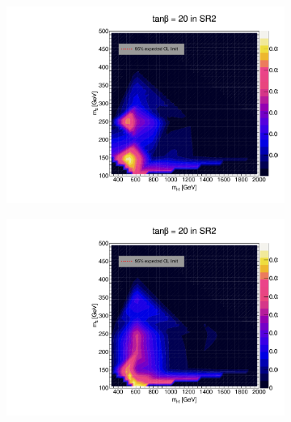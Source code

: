 \documentclass[12pt, a4paper]{book}
\begin{document}
\begin{figure}[!ht]
\begin{subfigure}[b]{0.49\textwidth}
   \end{subfigure}
   \hfill
   \begin{subfigure}[b]{0.49\textwidth}
      \centering
      \includegraphics[width=1\textwidth]{Limits/Model_independent/100-150/2HDM/2HDM_ee_tb20.pdf}
   \end{subfigure}
   \hfill
   \begin{subfigure}[b]{0.49\textwidth}
      \centering
      \includegraphics[width=1\textwidth]{Limits/Model_independent/100-150/2HDM/2HDM_uu_tb20.pdf}
   \end{subfigure}
   \hfill
	\begin{subfigure}[b]{0.49\textwidth}
      \centering

\end{subfigure}
\end{figure}
\end{document}
